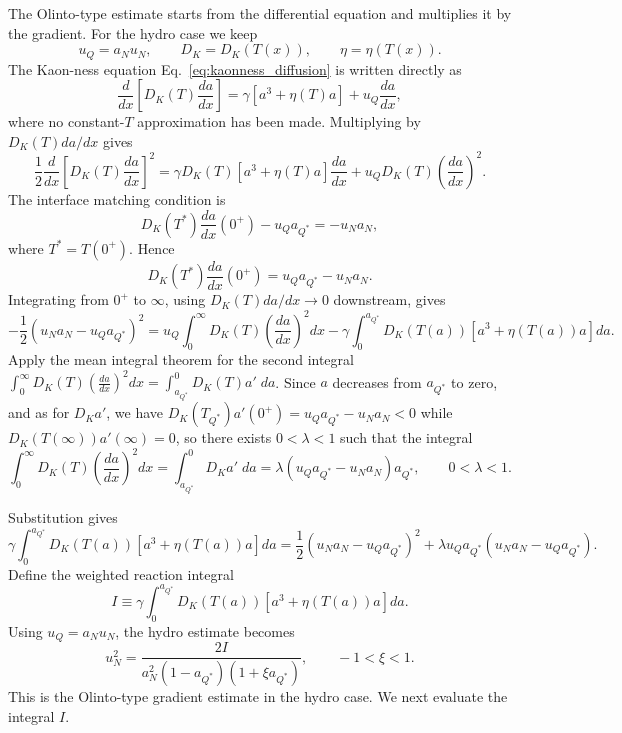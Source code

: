 \documentclass[11pt]{article}
\begin{document}
The Olinto-type estimate starts from the differential equation and multiplies it
by the gradient. For the hydro case we keep
\begin{equation}
u_Q=a_Nu_N,\qquad
D_K=D_K(T(x)),\qquad
\eta=\eta(T(x)).
\end{equation}
The Kaon-ness equation Eq.~\eqref{eq:kaonness_diffusion} is written directly as
\begin{equation}
\frac{d}{dx}\left[D_K(T)\frac{da}{dx}\right]
=
\gamma\left[a^3+\eta(T)a\right]
+u_Q\frac{da}{dx},
\end{equation}
where no constant-\(T\) approximation has been made. Multiplying by
\(D_K(T)da/dx\) gives
\begin{equation}
\frac{1}{2}
\frac{d}{dx}
\left[
D_K(T)\frac{da}{dx}
\right]^2
=
\gamma D_K(T)\left[a^3+\eta(T)a\right]\frac{da}{dx}
+u_QD_K(T)\left(\frac{da}{dx}\right)^2 .
\end{equation}
The interface matching condition is
\begin{equation}
D_K(T^*)\frac{da}{dx}(0^+)-u_Qa_{Q^*}=-u_Na_N ,
\end{equation}
where \(T^*=T(0^+)\). Hence
\begin{equation}
D_K(T^*)\frac{da}{dx}(0^+)
=
u_Qa_{Q^*}-u_Na_N .
\end{equation}
Integrating from \(0^+\) to \(\infty\), using
\(D_K(T)da/dx\to0\) downstream, gives
\begin{equation}
-\frac{1}{2}
\left(u_Na_N-u_Qa_{Q^*}\right)^2
=
u_Q\int_0^\infty
D_K(T)\left(\frac{da}{dx}\right)^2 dx
-
\gamma
\int_0^{a_{Q^*}}
D_K(T(a))
\left[a^3+\eta(T(a))a\right] da .
\end{equation}
Apply the mean integral theorem for the second integral $\int_0^\infty
D_K(T)\left(\frac{da}{dx}\right)^2 dx = \int_{a_{Q^*}}^0 D_K(T)a'\;da$. 
Since \(a\) decreases from \(a_{Q^*}\) to zero, and as for $D_Ka'$, we have \(D_K(T_{Q^*})a'(0^+)=u_Qa_{Q^*}-u_Na_N<0\) while $D_K(T(\infty))a'(\infty) = 0$, so there exists $0<\lambda<1$ such that the integral
\begin{equation}
\int_0^\infty
D_K(T)\left(\frac{da}{dx}\right)^2 dx
=
\int_{a_{Q^*}}^0 D_Ka'\;da
=
\lambda\left(u_Qa_{Q^*}-u_Na_N\right)a_{Q^*},
\qquad
0<\lambda<1 .
\end{equation}

Substitution gives
\begin{equation}
\gamma
\int_0^{a_{Q^*}}
D_K(T(a))
\left[a^3+\eta(T(a))a\right] da
=
\frac{1}{2}
\left(u_Na_N-u_Qa_{Q^*}\right)^2
+
\lambda u_Qa_{Q^*}
\left(u_Na_N-u_Qa_{Q^*}\right).
\end{equation}
Define the weighted reaction integral
\begin{equation}
I\equiv
\gamma
\int_0^{a_{Q^*}}
D_K(T(a))
\left[a^3+\eta(T(a))a\right]da .
\end{equation}
Using \(u_Q=a_Nu_N\), the hydro estimate becomes
\begin{equation}
u_N^2
=
\frac{
2I
}{
a_N^2\left(1-a_{Q^*}\right)\left(1+\xi a_{Q^*}\right)
},
\qquad
-1<\xi<1 .
\end{equation}
This is the Olinto-type gradient estimate in the hydro case. We next evaluate
the integral \(I\).
\end{document}
